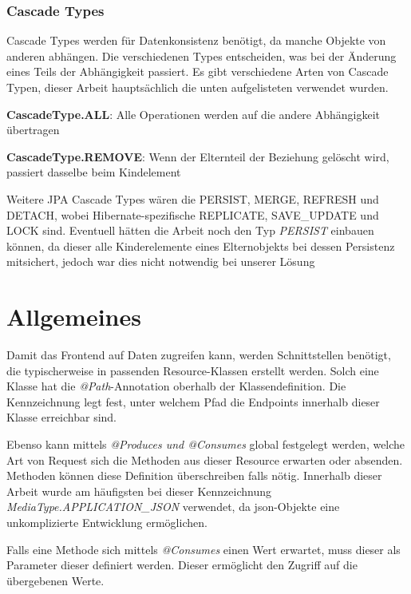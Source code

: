 \subsubsection{Cascade Types}
\label{chap:cascade}

Cascade Types werden für Datenkonsistenz benötigt, da manche Objekte von anderen abhängen. 
Die verschiedenen Types entscheiden, was bei der Änderung eines Teils der Abhängigkeit passiert. 
Es gibt verschiedene Arten von Cascade Typen, dieser Arbeit hauptsächlich die unten aufgelisteten verwendet wurden.
\cite{CascadeTypes}

\begin{compactitem}
    \item \textbf{CascadeType.ALL}: Alle Operationen werden auf die andere Abhängigkeit übertragen \cite{CascadeTypes}
    \item \textbf{CascadeType.REMOVE}: Wenn der Elternteil der Beziehung gelöscht wird, passiert dasselbe beim Kindelement \cite{CascadeTypes}
\end{compactitem}

Weitere JPA Cascade Types wären die PERSIST, MERGE, REFRESH und DETACH, wobei Hibernate-spezifische REPLICATE, SAVE\_UPDATE und LOCK sind.
Eventuell hätten die Arbeit noch den Typ \emph{PERSIST} einbauen können, da dieser alle Kinderelemente eines Elternobjekts bei dessen Persistenz mitsichert, jedoch war dies nicht notwendig bei unserer Lösung
\cite{CascadeTypes}


\section{Allgemeines}

Damit das Frontend auf Daten zugreifen kann, werden Schnittstellen benötigt, die typischerweise in passenden Resource-Klassen erstellt werden. 
Solch eine Klasse hat die \emph{@Path}-Annotation oberhalb der Klassendefinition. 
Die Kennzeichnung legt fest, unter welchem Pfad die Endpoints innerhalb dieser Klasse erreichbar sind.

Ebenso kann mittels \emph{@Produces und @Consumes} global festgelegt werden, welche Art von Request sich die Methoden aus dieser Resource erwarten oder absenden. 
Methoden können diese Definition überschreiben falls nötig. 
Innerhalb dieser Arbeit wurde am häufigsten bei dieser Kennzeichnung \emph{MediaType.APPLICATION\_JSON} verwendet, da \gls{json}-Objekte eine unkomplizierte Entwicklung ermöglichen.

Falls eine Methode sich mittels \emph{@Consumes} einen Wert erwartet, muss dieser als Parameter dieser definiert werden. 
Dieser ermöglicht den Zugriff auf die übergebenen Werte.

